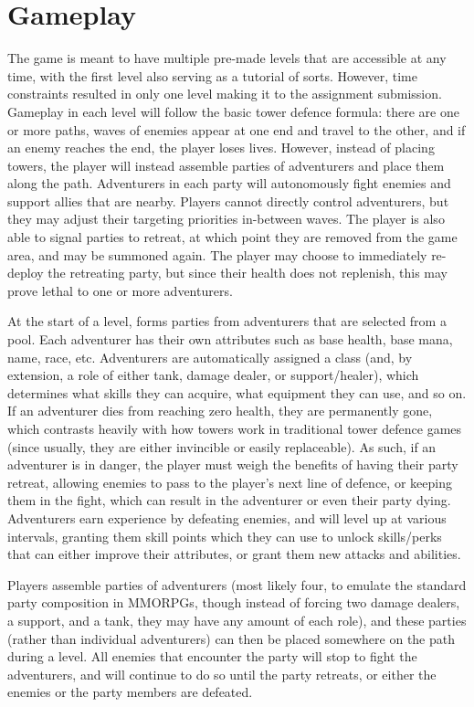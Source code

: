 \documentclass[10pt]{article}
\begin{document}
\section{Gameplay}

The game is meant to have multiple pre-made levels that are accessible at any time, with the first level also serving as a tutorial of sorts.
However, time constraints resulted in only one level making it to the assignment submission.
Gameplay in each level will follow the basic tower defence formula: there are one or more paths, waves of enemies appear at one end and travel to the other,
and if an enemy reaches the end, the player loses lives. However, instead of placing towers, the player will instead assemble parties of adventurers
and place them along the path. Adventurers in each party will autonomously fight enemies and support allies that are nearby. Players cannot directly
control adventurers, but they may adjust their targeting priorities in-between waves. The player is also able to signal parties to retreat, at which point
they are removed from the game area, and may be summoned again. The player may choose to immediately re-deploy the retreating party,
but since their health does not replenish, this may prove lethal to one or more adventurers.

At the start of a level, forms parties from adventurers that are selected from a pool.
Each adventurer has their own attributes such as base health, base mana, name, race, etc. Adventurers are
automatically assigned a class (and, by extension, a role of either tank, damage dealer, or support/healer), which determines what skills they can acquire,
what equipment they can use, and so on. If an adventurer dies from reaching zero health, they are permanently gone, which contrasts heavily with how
towers work in traditional tower defence games (since usually, they are either invincible or easily replaceable). As such, if an adventurer is in danger,
the player must weigh the benefits of having their party retreat, allowing enemies to pass to the player's next line of defence, or keeping them
in the fight, which can result in the adventurer or even their party dying. Adventurers earn experience by defeating enemies, and will level up
at various intervals, granting them skill points which they can use to unlock skills/perks that can either improve their attributes, or grant them
new attacks and abilities.

Players assemble parties of adventurers (most likely four, to emulate the standard party composition in MMORPGs, though instead of forcing two damage
dealers, a support, and a tank, they may have any amount of each role), and these parties (rather than individual adventurers) can then be placed
somewhere on the path during a level. All enemies that encounter the party will stop to fight the adventurers, and will continue to do so until the party
retreats, or either the enemies or the party members are defeated.
\end{document}
